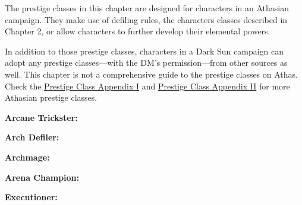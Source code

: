 The prestige classes in this chapter are designed for characters in an Athasian campaign. They make use of defiling rules, the characters classes described in Chapter 2, or allow characters to further develop their
elemental powers.

In addition to those prestige classes, characters in a {\tableheader Dark Sun} campaign can adopt any prestige classes---with the DM's permission---from other sources as well. This chapter is not a comprehensive guide to the prestige classes on Athas. Check the \href{http://athas.org/products/prc1}{Prestige Class Appendix I} and \href{http://athas.org/products/prc2}{Prestige Class Appendix II} for more Athasian prestige classes.

\textbf{Arcane Trickster:} 

\textbf{Arch Defiler:} 

\textbf{Archmage:} 

\textbf{Arena Champion:} 

\textbf{Executioner:} 


% 




